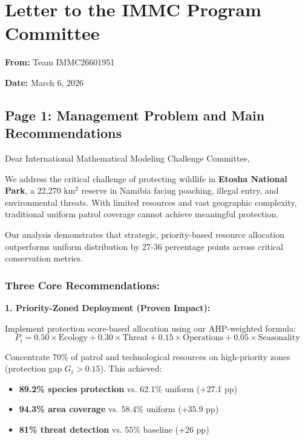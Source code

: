 \section*{Letter to the IMMC Program Committee}

\vspace{0.5cm}

\textbf{From:} Team IMMC26601951

\textbf{Date:} March 6, 2026

\vspace{0.5cm}

\subsection*{Page 1: Management Problem and Main Recommendations}

Dear International Mathematical Modeling Challenge Committee,

We address the critical challenge of protecting wildlife in \textbf{Etosha National Park}, a 22,270 km$^2$ reserve in Namibia facing poaching, illegal entry, and environmental threats. With limited resources and vast geographic complexity, traditional uniform patrol coverage cannot achieve meaningful protection.

Our analysis demonstrates that strategic, priority-based resource allocation outperforms uniform distribution by 27-36 percentage points across critical conservation metrics.

\subsubsection*{Three Core Recommendations:}

\noindent \textbf{1. Priority-Zoned Deployment (Proven Impact):}

Implement protection score-based allocation using our AHP-weighted formula:
\[
P_i = 0.50 \times \text{Ecology} + 0.30 \times \text{Threat} + 0.15 \times \text{Operations} + 0.05 \times \text{Seasonality}
\]

\noindent Concentrate 70\% of patrol and technological resources on high-priority zones (protection gap $G_i > 0.15$). This achieved:
\begin{itemize}
\item \textbf{89.2\% species protection} vs. 62.1\% uniform (+27.1 pp)
\item \textbf{94.3\% area coverage} vs. 58.4\% uniform (+35.9 pp)
\item \textbf{81\% threat detection} vs. 55\% baseline (+26 pp)
\end{itemize}

